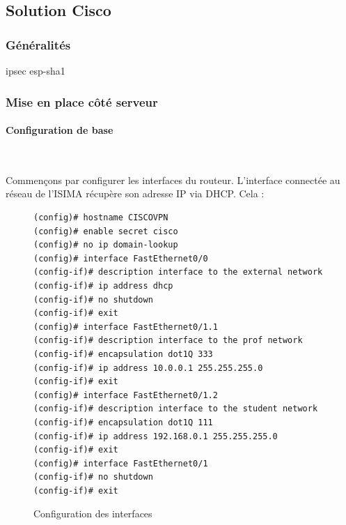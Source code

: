 \subsection{Solution Cisco}

\subsubsection{Généralités}
ipsec esp-sha1

\subsubsection{Mise en place côté serveur}

\paragraph{Configuration de base}
~

Commençons par configurer les interfaces du routeur. L'interface connectée au réseau de l'ISIMA récupère son adresse IP via DHCP. Cela :
\begin{figure}[H]
	\begin{center}
		\begin{minipage}{0.90\textwidth}
			\begin{lstlisting}[frame=trBL]
(config)# hostname CISCOVPN
(config)# enable secret cisco
(config)# no ip domain-lookup
(config)# interface FastEthernet0/0
(config-if)# description interface to the external network
(config-if)# ip address dhcp
(config-if)# no shutdown
(config-if)# exit
(config)# interface FastEthernet0/1.1
(config-if)# description interface to the prof network
(config-if)# encapsulation dot1Q 333
(config-if)# ip address 10.0.0.1 255.255.255.0
(config-if)# exit
(config)# interface FastEthernet0/1.2
(config-if)# description interface to the student network
(config-if)# encapsulation dot1Q 111
(config-if)# ip address 192.168.0.1 255.255.255.0
(config-if)# exit
(config)# interface FastEthernet0/1
(config-if)# no shutdown
(config-if)# exit
			\end{lstlisting}
		\end{minipage}
	\end{center}
	\caption{Configuration des interfaces}
	\label{configuration_interfaces}
\end{figure}

~

